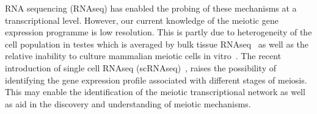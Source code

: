 RNA sequencing (RNAseq) has enabled the probing of these mechanisms at a transcriptional level. However, our current knowledge of the meiotic gene expression programme is low resolution. This is partly due to heterogeneity of the cell population in testes which is averaged by bulk tissue RNAseq~\cite{YasuhiroFUJIWAR2014Differential} as well as the relative inability to culture mammalian meiotic cells in vitro~\cite{Zhou2016Complete}. The recent introduction of single cell RNAseq (scRNAseq)~\cite{Gawad2016Singlecell}, raises the possibility of identifying the gene expression profile associated with different stages of meiosis. This may enable the identification of the meiotic transcriptional network as well as aid in the discovery and understanding of meiotic mechanisms.
